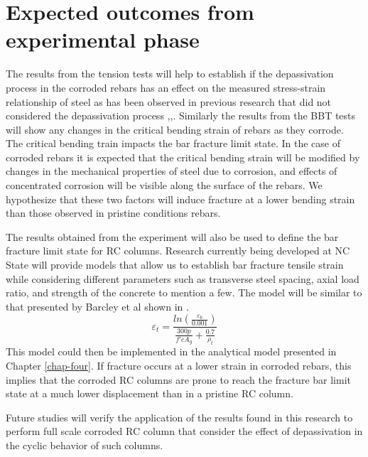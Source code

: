 \section{Expected outcomes from experimental phase}

The results from the tension tests will help to establish if the depassivation process in the corroded rebars has an effect on the measured stress-strain relationship of steel as has been observed in previous research that did not considered the depassivation process \cite{Meda2014},\cite{Yuan2017a},\cite{Du2005}. Similarly the results from the BBT tests will show any changes in the critical bending strain of rebars as they corrode. The critical bending train impacts the bar fracture limit state. In the case of corroded rebars it is expected that the critical bending strain will be modified by changes in the mechanical properties of steel due to corrosion, and effects of concentrated corrosion will be visible along the surface of the rebars. We hypothesize that these two factors will induce fracture at a lower bending strain than those observed in pristine conditions rebars\cite{Barcley2019}.

The results obtained from the experiment will also be used to define the bar fracture limit state for RC columns. Research currently being developed at NC State will provide models that allow us to establish bar fracture tensile strain while considering different parameters such as transverse steel spacing, axial load ratio, and strength of the concrete to mention a few. The model will be similar to that presented by Barcley et al \cite{Barcley2018} shown in . 
\begin{equation}
    \varepsilon_{t}=\frac{ln(\frac{\varepsilon_{b}}{0.001})}{\frac{300p}{f'c A_{g}}+\frac{0.7}{\rho_{t}}}
    \label{eq.BarFracture}
\end{equation}
This model could then be implemented in the analytical model presented in Chapter \ref{chap-four}. If fracture occurs at a lower strain in corroded rebars, this implies that the corroded RC columns are prone to reach the fracture bar limit state at a much lower displacement than in a pristine RC column.

Future studies will verify the application of the results found in this research to perform full scale corroded RC column that consider the effect of depassivation in the cyclic behavior of such columns.